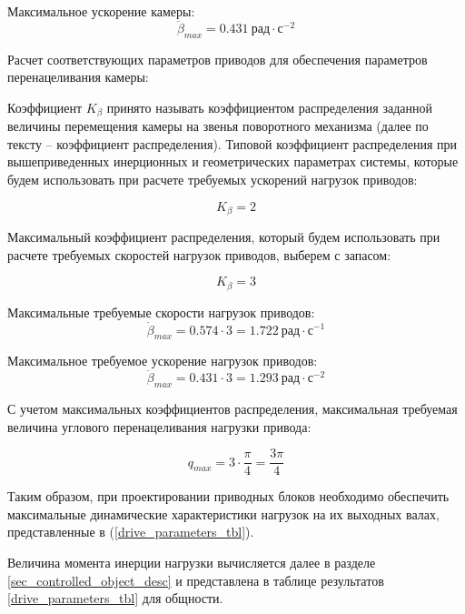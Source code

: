 Максимальное ускорение камеры:
\begin{equation}
    \ddot{\beta}_{max} = 0.431 ~\textit{рад} \cdot \textit{с}^{-2}
\end{equation}

Расчет соответствующих параметров приводов для обеспечения параметров перенацеливания камеры:

Коэффициент $ K_{\beta} $  принято называть коэффициентом распределения заданной величины перемещения камеры на
звенья поворотного механизма (далее по тексту – коэффициент распределения).
Типовой коэффициент распределения при вышеприведенных инерционных и геометрических параметрах
системы, которые будем использовать при расчете требуемых ускорений нагрузок приводов:

\begin{equation}
    K_{\beta} = 2
\end{equation}

Максимальный коэффициент распределения, который будем использовать при расчете требуемых скоростей
нагрузок приводов, выберем с запасом:

\begin{equation}
    K_{\beta} = 3
\end{equation}

Максимальные требуемые скорости нагрузок приводов:
\begin{equation}
    \dot{\beta}_{max} = 0.574 \cdot 3 = 1.722 ~\textit{рад} \cdot \textit{с}^{-1}
\end{equation}

Максимальное требуемое ускорение нагрузок приводов:
\begin{equation}
    \ddot{\beta}_{max} = 0.431 \cdot 3 = 1.293 ~\textit{рад} \cdot \textit{с}^{-2}
\end{equation}

С учетом максимальных коэффициентов распределения, максимальная требуемая величина
углового перенацеливания нагрузки привода:

\begin{equation}
    q_{max} = 3 \cdot \frac{\pi}{4} = \frac{3 \pi}{4}
\end{equation}

Таким образом, при проектировании приводных блоков необходимо обеспечить максимальные динамические
характеристики нагрузок на их выходных валах, представленные в (\ref{drive_parameters_tbl}).

Величина момента инерции нагрузки вычисляется далее в разделе \ref{sec_controlled_object_desc}
и представлена в таблице результатов \ref{drive_parameters_tbl} для общности.

